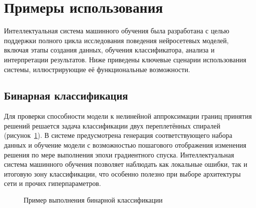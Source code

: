 \section{Примеры использования}

Интеллектуальная система машинного обучения была разработана с целью поддержки полного цикла исследования поведения нейросетевых моделей, включая этапы создания данных, обучения классификатора, анализа и интерпретации результатов. Ниже приведены ключевые сценарии использования системы, иллюстрирующие её функциональные возможности.

\subsection{Бинарная классификация}
Для проверки способности модели к нелинейной аппроксимации границ принятия решений решается задача классификации двух переплетённых спиралей (рисунок~\cref{fig:vis_binary_classification}). В системе предусмотрена генерация соответствующего набора данных и обучение модели с возможностью пошагового отображения изменения решения по мере выполнения эпохи градиентного спуска. Интеллектуальная система машинного обучения позволяет наблюдать как локальные ошибки, так и итоговую зону классификации, что особенно полезно при выборе архитектуры сети и прочих гиперпараметров.

\begin{figure}[ht]
    \caption{Пример выполнения бинарной классификации}
    \label{fig:vis_binary_classification}
\end{figure}

